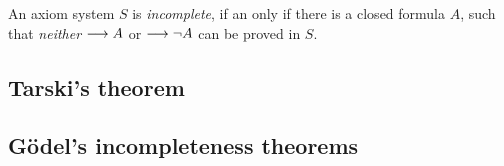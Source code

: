 \documentclass[11pt,a4paper]{article}
\begin{document}
\begin{definition}[Incompleteness]\label{def:incompleteness}
    An axiom system \(S\) is \emph{incomplete},
    if an only if there is a closed formula \(A\),
    such that \emph{neither} \(\longrightarrow A\) or \(\longrightarrow\lnot A\)
    can be proved in \(S\).
\end{definition}

\subsection{Tarski's theorem}

\subsection{Gödel's incompleteness theorems}

{\raggedright%
\printbibliography[heading=bibintoc]%
}
\end{document}
